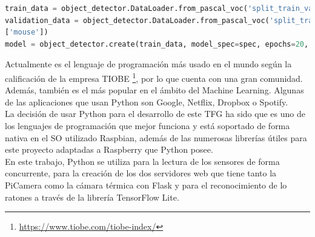 \begin{code}[h]
\begin{lstlisting}[language=Python]
train_data = object_detector.DataLoader.from_pascal_voc('split_train_validate/train', 'split_train_validate/train', ['mouse'])
validation_data = object_detector.DataLoader.from_pascal_voc('split_train_validate/validate', 'split_train_validate/validate', 
['mouse'])
model = object_detector.create(train_data, model_spec=spec, epochs=20, batch_size=8, train_whole_model=True, validation_data=validation_data)
\end{lstlisting}
\caption[Código para generar un modelo de detección de ratones en Python]{Código para generar un modelo de detección de ratones en Python}
\label{cod:pythonML}
\end{code}

Actualmente es el lenguaje de programación más usado en el mundo según la calificación de la empresa TIOBE \footnote{\url{https://www.tiobe.com/tiobe-index/}}, por lo que cuenta con una gran comunidad. Además, también es el más popular en el ámbito del Machine Learning. Algunas de las aplicaciones que usan Python son Google, Netflix, Dropbox o Spotify.\\

La decisión de usar Python para el desarrollo de este TFG ha sido que es uno de los lenguajes de programación que mejor funciona y está soportado de forma nativa en el SO utilizado Raspbian, además de las numerosas librerías útiles para este proyecto adaptadas a Raspberry que Python posee.\\

En este trabajo, Python se utiliza para la lectura de los sensores de forma concurrente, para la creación de los dos servidores web que tiene tanto la PiCamera como la cámara térmica con Flask y para el reconocimiento de lo ratones a través de la librería TensorFlow Lite.\\

